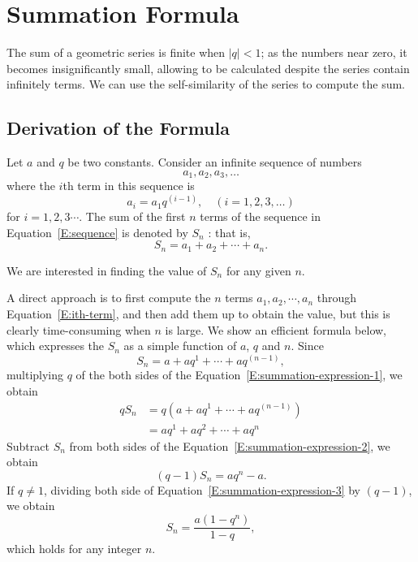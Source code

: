\section{Summation Formula}\label{S:summation-formula}
The sum of a geometric series is finite when $|q|<1$; as the numbers near zero, it becomes insignificantly small, allowing to be calculated despite the series contain infinitely terms. We can use the self-similarity of the series to compute the sum.
\subsection{Derivation of the Formula}
Let $a$ and $q$ be two constants. Consider an infinite sequence of numbers
\begin{equation}\label{E:sequence}
    a_1, a_2, a_3, \ldots
\end{equation}
where the $i$th term in this sequence is
\begin{equation}\label{E:ith-term}
    a_i = a_1 q^{(i-1)}, \quad (i=1,2,3,\ldots)
\end{equation}
for $i=1,2,3\cdots$. The sum of the first $n$ terms of the sequence in Equation~\eqref{E:sequence} is denoted by $S_n$ : that is,
\begin{equation*}
    S_n = a_1 + a_2 + \cdots + a_n.
\end{equation*}

We are interested in finding the value of $S_n$ for any given $n$.

A direct approach is to first compute the $n$ terms ${a_1,a_2,\cdots,a_n}$ through Equation~\eqref{E:ith-term}, and then add them up to obtain the value, but this is clearly time-consuming when $n$ is large. We show an efficient formula below, which expresses the $S_n$ as a simple function of $a$, $q$ and $n$. Since
\begin{equation}\label{E:summation-expression-1}
    S_n = a + aq^1 + \cdots + aq^{(n-1)},
\end{equation}
multiplying $q$ of the both sides of the Equation~\ref{E:summation-expression-1}, we obtain
\begin{equation}\label{E:summation-expression-2}
    \begin{aligned}
        qS_n &= q(a + aq^1 + \cdots + aq^{(n-1)}) \\
             &= aq^1 + aq^2 + \cdots + aq^n
    \end{aligned}
\end{equation}
Subtract $S_n$ from both sides of the Equation~\eqref{E:summation-expression-2}, we obtain
\begin{equation}\label{E:summation-expression-3}
    (q-1)S_n = aq^n - a.
\end{equation}
If $q\neq 1$, dividing both side of Equation~\eqref{E:summation-expression-3} by $(q-1)$, we obtain
\begin{equation*}
    S_n = \frac{a(1-q^n)}{1-q},
\end{equation*}
which holds for any integer $n$.

